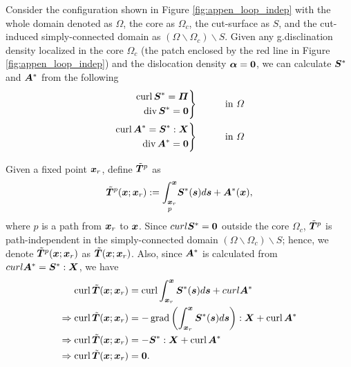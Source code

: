 \documentclass[11pt,letterpaper]{article}
\newenvironment{rcases}
  {\left.\begin{aligned}}
  {\end{aligned}\right\rbrace}
\begin{document}
Consider the configuration shown in Figure \ref{fig:appen_loop_indep} with the whole domain denoted as $\Omega$, the core as $\Omega_c$, the cut-surface as $S$, and the cut-induced simply-connected domain as $(\Omega\backslash\Omega_c)\backslash S$. Given any g.disclination density localized in the core $\Omega_c$ (the patch enclosed by the red line in Figure \ref{fig:appen_loop_indep}) and the dislocation density $\bfalpha = \bf0$, we can calculate $\bfS^{*}$ and $\bfA^{*}$ from the following
\begin{eqnarray*}
\begin{rcases}
\curl \bfS^{*} = \bfPi \\
\divergence \bfS^{*} = \bf0 
\end{rcases}
&&\qquad \text{in $\Omega$} \\
\begin{rcases}
\curl \bfA^{*} = \bfS^{*}:\bfX \\
\divergence \bfA^{*} = \bf0 
\end{rcases}
&&\qquad \text{in $\Omega$} 
\end{eqnarray*} 
 
Given a fixed point $\bfx_r$, define $\tilde{\bfT}^p$ as
\[
\tilde{\bfT}^p(\bfx; \bfx_r)  :=   \underset{p}{\int_{\bfx_r}^{\bfx}}\bfS^{*}(\bfs) d\bfs  + \bfA^{*}(\bfx),
 \]
 where $p$ is a path from $\bfx_r$ to $\bfx$. Since $curl \bfS^{*} = \bf0$ outside the core $\Omega_c$, $\tilde{\bfT}^p$ is path-independent in the simply-connected domain $(\Omega\backslash \Omega_c ) \backslash S$; hence, we denote $\tilde{\bfT}^p(\bfx; \bfx_r)$ as $\tilde{\bfT}(\bfx; \bfx_r)$. Also, since $\bfA^{*}$ is calculated from $curl \bfA^{*} = \bfS^{*}:\bfX$, we have
\begin{eqnarray*}
\begin{aligned}
\curl \tilde{\bfT}(\bfx; \bfx_r) &= \curl \int_{\bfx_r}^{\bfx}\bfS^{*}(\bfs) d\bfs + curl \bfA^{*} \\
\Rightarrow \curl \tilde{\bfT}(\bfx; \bfx_r) &= - \grad \left(\int_{\bfx_r}^{\bfx}\bfS^{*}(\bfs) d\bfs\right) : \bfX + \curl \bfA^{*}\\
\Rightarrow \curl \tilde{\bfT}(\bfx; \bfx_r) &= -\bfS^{*} :\bfX + \curl \bfA^{*} \\
\Rightarrow \curl \tilde{\bfT}(\bfx; \bfx_r) &= \bf0.
\end{aligned}
\end{eqnarray*}
 
\end{document}
